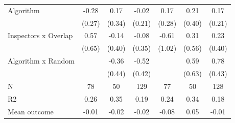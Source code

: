 \begin{tabular}{lccc|ccc}
Algorithm   &       -0.28         &        0.17         &       -0.02         &        0.17         &        0.21         &        0.17         \\
            &      (0.27)         &      (0.34)         &      (0.21)         &      (0.28)         &      (0.40)         &      (0.21)         \\
\addlinespace
Inspectors x Overlap&        0.57         &       -0.14         &       -0.08         &       -0.61         &        0.31         &        0.23         \\
            &      (0.65)         &      (0.40)         &      (0.35)         &      (1.02)         &      (0.56)         &      (0.40)         \\
\addlinespace
Algorithm x Random&                     &       -0.36         &       -0.52         &                     &        0.59         &        0.78\sym{*}  \\
            &                     &      (0.44)         &      (0.42)         &                     &      (0.63)         &      (0.43)         \\
\midrule
N           &          78         &          50         &         129         &          77         &          50         &         128         \\
R2          &        0.26         &        0.35         &        0.19         &        0.24         &        0.34         &        0.18         \\
Mean outcome&       -0.01         &       -0.02         &       -0.02         &       -0.08         &        0.05         &       -0.01         \\
\bottomrule \end{tabular}
